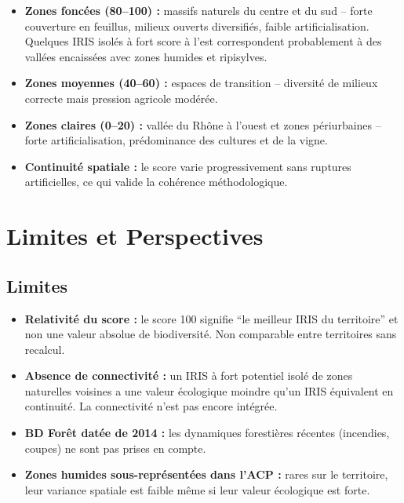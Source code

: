 \documentclass[11pt,a4paper]{report}
\begin{document}
\begin{itemize}[leftmargin=1.5cm]
  \item \textbf{Zones foncées (80--100) :} massifs naturels du centre et du sud -- forte couverture en feuillus, milieux ouverts diversifiés, faible artificialisation. Quelques IRIS isolés à fort score à l'est correspondent probablement à des vallées encaissées avec zones humides et ripisylves.
  \item \textbf{Zones moyennes (40--60) :} espaces de transition -- diversité de milieux correcte mais pression agricole modérée.
  \item \textbf{Zones claires (0--20) :} vallée du Rhône à l'ouest et zones périurbaines -- forte artificialisation, prédominance des cultures et de la vigne.
  \item \textbf{Continuité spatiale :} le score varie progressivement sans ruptures artificielles, ce qui valide la cohérence méthodologique.
\end{itemize}

\section{Limites et Perspectives}

\subsection{Limites}

\begin{itemize}[leftmargin=1.5cm]
  \item \textbf{Relativité du score :} le score 100 signifie ``le meilleur IRIS du territoire'' et non une valeur absolue de biodiversité. Non comparable entre territoires sans recalcul.
  \item \textbf{Absence de connectivité :} un IRIS à fort potentiel isolé de zones naturelles voisines a une valeur écologique moindre qu'un IRIS équivalent en continuité. La connectivité n'est pas encore intégrée.
  \item \textbf{BD Forêt datée de 2014 :} les dynamiques forestières récentes (incendies, coupes) ne sont pas prises en compte.
  \item \textbf{Zones humides sous-représentées dans l'ACP :} rares sur le territoire, leur variance spatiale est faible même si leur valeur écologique est forte.
\end{itemize}
\end{document}
